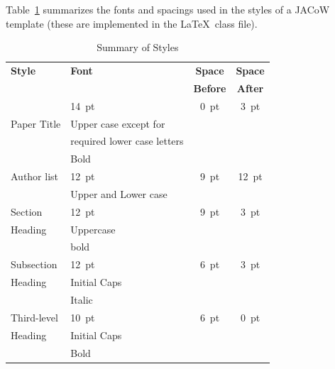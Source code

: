 \documentclass[acus,%
              ]{jacow}
\begin{document}
Table~\ref{style-tab} summarizes the fonts and spacings used in the styles of
a JACoW template (these are implemented in the \LaTeX\ class file).
\begin{table}[h!t]
    \setlength\tabcolsep{3.8pt}
    \caption{Summary of Styles}
    \label{style-tab}
    \begin{tabular}{@{}llcc@{}}
        \toprule
        \textbf{Style} & \textbf{Font}               & \textbf{Space}  & \textbf{Space} \\
                       &                             & \textbf{Before} & \textbf{After} \\
        \midrule
                       & \SI{14}{pt}                 & \SI{0}{pt}      & \SI{3}{pt}  \\
          Paper Title  & Upper case except for       &                 &      \\
                       & required lower case letters &                 &      \\   %
                       & Bold                        &                 &      \\
         \midrule
          Author list  & \SI{12}{pt}                 & \SI{9}{pt}      & \SI{12}{pt} \\
                       & Upper and Lower case        &                 &      \\
         \midrule
         Section       & \SI{12}{pt}                 & \SI{9}{pt}      & \SI{3}{pt}  \\
         Heading       & Uppercase                   &                 &      \\
                       & bold                        &                 &      \\
        \midrule
         Subsection    & \SI{12}{pt}                 & \SI{6}{pt}      & \SI{3}{pt}  \\
         Heading       & Initial Caps                &                 &      \\
                       & Italic                      &                 &      \\
        \midrule
         Third-level   & \SI{10}{pt}                 & \SI{6}{pt}           & \SI{0}{pt}  \\
         Heading       & Initial Caps                &                 &      \\
                       & Bold                        &                 &      \\

\end{tabular}
\end{table}
\end{document}
